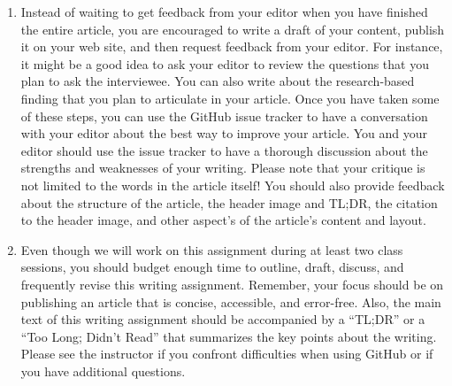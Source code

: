 \begin{enumerate}
  \item Instead of waiting to get feedback from your editor when you have finished the entire article, you are
    encouraged to write a draft of your content, publish it on your web site, and then request feedback from your
    editor. For instance, it might be a good idea to ask your editor to review the questions that you plan to ask the
    interviewee. You can also write about the research-based finding that you plan to articulate in your article. Once
    you have taken some of these steps, you can use the GitHub issue tracker to have a conversation with your editor
    about the best way to improve your article. You and your editor should use the issue tracker to have a thorough
    discussion about the strengths and weaknesses of your writing. Please note that your critique is not limited to the
    words in the article itself! You should also provide feedback about the structure of the article, the header image
    and TL;DR, the citation to the header image, and other aspect's of the article's content and layout.


  \item Even though we will work on this assignment during at least two class sessions, you should budget enough time to
    outline, draft, discuss, and frequently revise this writing assignment. Remember, your focus should be on publishing
    an article that is concise, accessible, and error-free. Also, the main text of this writing assignment should be
    accompanied by a ``TL;DR'' or a ``Too Long; Didn't Read'' that summarizes the key points about the writing. Please
    see the instructor if you confront difficulties when using GitHub or if you have additional questions.


\end{enumerate}

